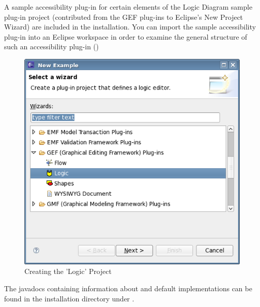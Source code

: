 A sample accessibility plug-in for certain elements of the Logic Diagram sample plug-in project (contributed from the GEF plug-ins to Eclipse's New Project Wizard) are included in the installation. You can import the sample accessibility plug-in into an Eclipse workspace in order to examine the general structure of such an accessibility plug-in ()

\begin{figure}[h]
\begin{center}
\includegraphics[width=12.5cm]{Toolkit/GEF/PS/newlogicwizard}
\caption{Creating the 'Logic' Project}
\label{newlogicwizard}
\end{center}
\end{figure}



The javadocs containing information about  and default implementations can be found in the installation directory under .
\clearpage
